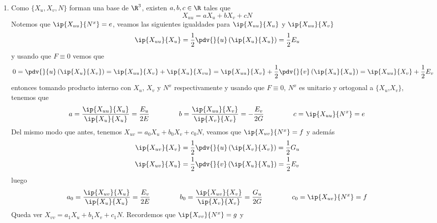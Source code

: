 \documentclass{article}
\begin{document}
\begin{enumerate}
    \item Como $\{X_{u},X_{v},N\}$ forman una base de $\R^{3}$, existen $a,b,c\in\R$ tales que
    \begin{equation*}
        X_{uu}=aX_{u}+bX_{v}+cN
    \end{equation*}
    Notemos que $\ip{X_{uu}}{N^{x}}=e$, veamos las siguientes igualdades para $\ip{X_{uu}}{X_{u}}$ 
    y $\ip{X_{uu}}{X_{v}}$
    \begin{equation*}
        \ip{X_{uu}}{X_{u}}=\frac{1}{2}\pdv{}{u}\left(\ip{X_{u}}{X_{u}}\right)=\frac{1}{2}E_{u}
    \end{equation*}
    y usando que $F\equiv0$ vemos que
    \begin{equation*}
        0=\pdv{}{u}\left(\ip{X_{u}}{X_{v}}\right)=\ip{X_{uu}}{X_{v}}+\ip{X_{u}}{X_{vu}}
        =\ip{X_{uu}}{X_{v}}+\frac{1}{2}\pdv{}{v}\left(\ip{X_{u}}{X_{u}}\right)
        =\ip{X_{uu}}{X_{v}}+\frac{1}{2}E_{v}
    \end{equation*}
    entonces tomando producto interno con $X_{u}$, $X_{v}$ y $N^{x}$ respectivamente y usando que
    $F\equiv0$, $N^{x}$ es unitario y ortogonal a $\{X_{u}$,$X_{v}\}$, tenemos que
    \begin{equation*}
        a=\frac{\ip{X_{uu}}{X_{u}}}{\ip{X_{u}}{X_{u}}}=\frac{E_{u}}{2E}\hspace{1.5cm}
        b=\frac{\ip{X_{uu}}{X_{v}}}{\ip{X_{v}}{X_{v}}}=-\frac{E_{v}}{2G}\hspace{1.5cm}
        c=\ip{X_{uu}}{N^{x}}=e
    \end{equation*}
    Del mismo modo que antes, tenemos $X_{uv}=a_{0}X_{u}+b_{0}X_{v}+c_{0}N$, veamos que 
    $\ip{X_{uv}}{N^{x}}=f$ y además
    \begin{align*}
        \ip{X_{uv}}{X_{v}} &= \frac{1}{2}\pdv{}{u}\left(\ip{X_{v}}{X_{v}}\right)
        =\frac{1}{2}G_{u} \\
        \ip{X_{uv}}{X_{u}} &= \frac{1}{2}\pdv{}{v}\left(\ip{X_{u}}{X_{u}}\right)
        =\frac{1}{2}E_{v}
    \end{align*}
    luego
    \begin{equation*}
        a_{0}=\frac{\ip{X_{uv}}{X_{u}}}{\ip{X_{u}}{X_{u}}}=\frac{E_{v}}{2E}\hspace{1.5cm}
        b_{0}=\frac{\ip{X_{uv}}{X_{v}}}{\ip{X_{v}}{X_{v}}}=\frac{G_{u}}{2G}\hspace{1.5cm}
        c_{0}=\ip{X_{uv}}{N^{x}}=f
    \end{equation*}
    Queda ver $ X_{vv}=a_{1}X_{u}+b_{1}X_{v}+c_{1}N$. Recordemos que $\ip{X_{vv}}{N^{x}}=g$ y

\end{enumerate}
\end{document}
